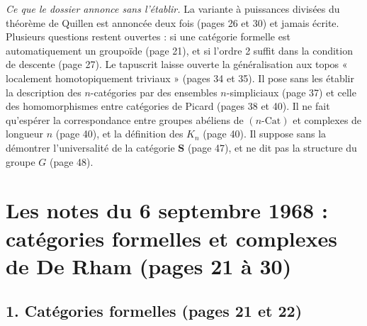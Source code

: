 \documentclass[11pt,a4paper]{article}
\begin{document}
\emph{Ce que le dossier annonce sans l'établir.} La variante à puissances
divisées du théorème de Quillen est annoncée deux fois (pages 26 et 30) et
jamais écrite. Plusieurs questions restent ouvertes : si une catégorie formelle
est automatiquement un groupoïde (page 21), et si l'ordre 2 suffit dans la
condition de descente (page 27). Le tapuscrit laisse ouverte la généralisation
aux topos « localement homotopiquement triviaux » (pages 34 et 35). Il pose sans
les établir la description des $n$-catégories par des ensembles
$n$-simpliciaux (page 37) et celle des homomorphismes entre catégories de
Picard (pages 38 et 40). Il ne fait qu'espérer la correspondance entre groupes
abéliens de $(n\text{-Cat})$ et complexes de longueur $n$ (page 40), et la
définition des $K_n$ (page 40). Il suppose sans la démontrer l'universalité de
la catégorie $\mathbf{S}$ (page 47), et ne dit pas la structure du groupe $G$
(page 48).

\section*{Les notes du 6 septembre 1968 : catégories formelles et complexes de De Rham (pages 21 à 30)}

\subsection*{1. Catégories formelles (pages 21 et 22)}
\end{document}
